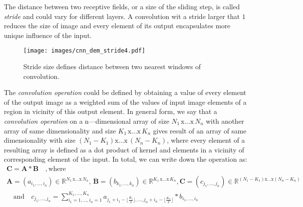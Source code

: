 The distance between two receptive fields, or a size of the sliding step,  is called \textit{stride} and could vary for different layers.
A convolution wit a stride larger that $1$ reduces the size of image and every element of its output encapsulates more unique influence of the input. 
\begin{figure}
	\centering
	\texttt{[image: images/cnn\_dem\_stride4.pdf]}
	\caption{Stride size defines distance between two nearest windows of convolution.}
	\label{fig:stride_demo}
	\end{figure}
\medskip

The \textit{convolution operation} could be defined by obtaining a value of every element of the output image as a weighted sum of the values of input image elements of a region in vicinity of this output element.
In general form, we say that a \emph{convolution operation} on a $\mathrm{n}$—dimensional array of size $N_{1} \, \mathrm{x}... \mathrm{x} \, N_{n}$ with another array of same dimensionality and size $K_{1} \, \mathrm{x}... \mathrm{x} \, K_{n} $ gives result of an array of same dimensionality with size $ (N_{1}-K_{1}) \mathrm{x}... \mathrm{x} \, (N_{n}-K_{n}) $, 
where every element of a resulting array is defined as a dot product of kernel and elements in a vicinity of corresponding element of the input.
In total, we can write down the operation as:
\begin{gather*}
\mathbf{C} = \mathbf{A} \ast \mathbf{B} \quad , \mathrm{where} \quad \\ \mathbf{A} = (a_{i_{1},...,i_{n}}) \in \mathbb{R}^{N_{1} \, \mathrm{x}... \mathrm{x} \, N_{n}} , \, \mathbf{B} = (b_{k_{1},...,k_{n}}) \in \mathbb{R}^{K_{1} \, \mathrm{x}... \mathrm{x} \, K_{n}},
\mathbf{C} = (c_{j_{1},...,j_{n}}) \in \mathbb{R}^{(N_{1}-K_{1}) \mathrm{x}... \mathrm{x} (N_{n}-K_{n})} \\ \quad \mathrm{and}
\quad c_{j_{1},...,j_{n}} = \sum_{i_{1}=1,...,i_{n}=1}^{K_{1},...,K_{n}} a_{j_{1}+i_{1}-\lfloor \frac{K_{i}}{2}\rfloor,...,j_{n}+i_{n}-\lfloor \frac{K_{n}}{2}\rfloor} \ast b_{i_{1},...,i_{n}}
\end{gather*}

